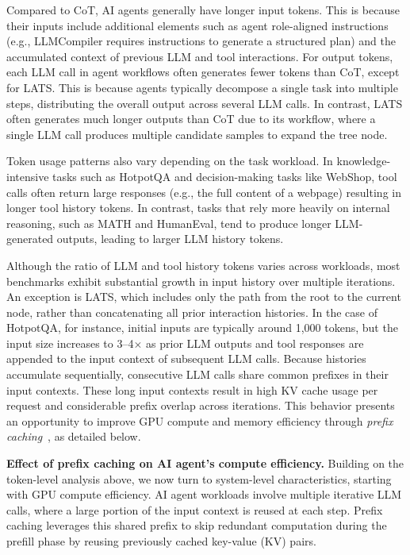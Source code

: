 Compared to CoT, AI agents generally have longer input tokens. This is because their inputs include additional elements such as agent role-aligned instructions (e.g., LLMCompiler requires instructions to generate a structured plan) and the accumulated context of previous LLM and tool interactions. For output tokens, each LLM call in agent workflows often generates fewer tokens than CoT, except for LATS. This is because agents typically decompose a single task into multiple steps, distributing the overall output across several LLM calls. In contrast, LATS often generates much longer outputs than CoT due to its workflow, where a single LLM call produces multiple candidate samples to expand the tree node.


Token usage patterns also vary depending on the task workload. In knowledge-intensive tasks such as HotpotQA and decision-making tasks like WebShop, tool calls often return large responses (e.g., the full content of a webpage) resulting in longer tool history tokens. In contrast, tasks that rely more heavily on internal reasoning, such as MATH and HumanEval, tend to produce longer LLM-generated outputs, leading to larger LLM history tokens.


Although the ratio of LLM and tool history tokens varies across workloads, most benchmarks exhibit substantial growth in input history over multiple iterations. An exception is LATS, which includes only the path from the root to the current node, rather than concatenating all prior interaction histories. 
In the case of HotpotQA, for instance, initial inputs are typically around 1,000 tokens, but the input size increases to 3–4$\times$ as prior LLM outputs and tool responses are appended to the input context of subsequent LLM calls. Because histories accumulate sequentially, consecutive LLM calls share common prefixes in their input contexts. These long input contexts result in high KV cache usage per request and considerable prefix overlap across iterations. This behavior presents an opportunity to improve GPU compute and memory efficiency through \emph{prefix caching}~\cite{vllm}, as detailed below.


\textbf{Effect of prefix caching on AI agent's compute efficiency.}
Building on the token-level analysis above, we now turn to system-level characteristics, starting with GPU compute efficiency. AI agent workloads involve multiple iterative LLM calls, where a large portion of the input context is reused at each step. Prefix caching leverages this shared prefix to skip redundant computation during the prefill phase by reusing previously cached key-value (KV) pairs.

